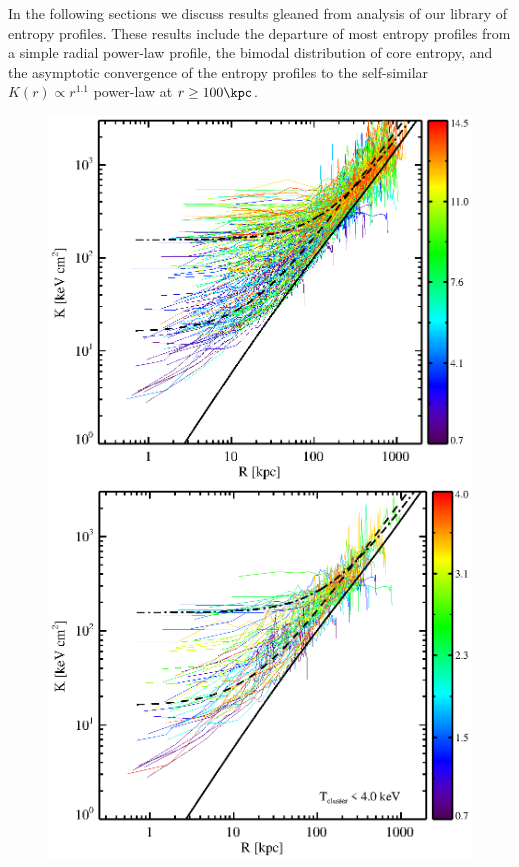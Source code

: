 In the following sections we discuss results gleaned from analysis of
our library of entropy profiles. These results include the departure
of most entropy profiles from a simple radial power-law profile, the
bimodal distribution of core entropy, and the asymptotic convergence
of the entropy profiles to the self-similar $K(r) \propto r^{1.1}$
power-law at $r \geq 100\kpc$.

\begin{center}
  \begin{figure}[htp]
    \begin{minipage}[htp]{0.5\linewidth}
      \includegraphics*[width=\textwidth, trim=28mm 7mm 30mm 17mm, clip]{splots_allt}
    \end{minipage}
    \begin{minipage}[htp]{0.5\linewidth}
      \includegraphics*[width=\textwidth, trim=28mm 7mm 30mm 17mm, clip]{splots_tle4}

\end{minipage}
\end{figure}
\end{center}

